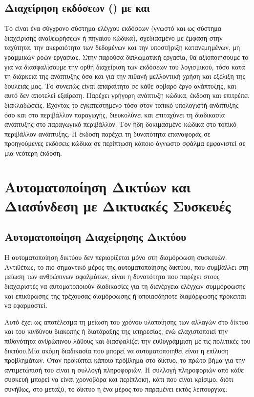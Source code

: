 \subsection{Διαχείρηση εκδόσεων () με  και  }

Το  είναι ένα σύγχρονο σύστημα ελέγχου εκδόσεων (γνωστό και ως σύστημα διαχείρισης αναθεωρήσεων ή πηγαίου κώδικα), 
σχεδιασμένο με έμφαση στην ταχύτητα, την ακεραιότητα των δεδομένων και την υποστήριξη κατανεμημένων, μη γραμμικών ροών εργασίας. 
Στην παρούσα διπλωματική εργασία, θα αξιοποιήσουμε το  για να διασφαλίσουμε την ορθή διαχείριση των εκδόσεων του λογισμικού, 
τόσο κατά τη διάρκεια της ανάπτυξης όσο και για την πιθανή μελλοντική χρήση και εξέλιξη της δουλειάς μας. Το  συνεπώς είναι απαραίτητο σε κάθε σοβαρό 
έργο ανάπτυξης, και αυτό δεν αποτελεί εξαίρεση. Παρέχει γρήγορη ανάπτυξη κώδικα, έκδοση και επιτρέπει διακλαδώσεις. Έχοντας το εγκατεστημένο τόσο στον τοπικό υπολογιστή ανάπτυξης όσο και στο περιβάλλον παραγωγής, διευκολύνει και επιταχύνει τη διαδικασία ανάπτυξης στο παραγωγικό περιβάλλον.
Τον ήδη δοκιμασμένο κώδικα στο τοπικό περιβάλλον ανάπτυξης. Η έκδοση παρέχει τη δυνατότητα επαναφοράς σε προηγούμενες εκδόσεις κώδικα σε
περίπτωση  κάποιο άγνωστο σφάλμα εμφανιστεί σε μια νεότερη έκδοση. 

\section{Αυτοματοποίηση Δικτύων και Διασύνδεση με Δικτυακές Συσκευές}

\subsection{Αυτοματοποίηση Διαχείρησης Δικτύου}

Η αυτοματοποίηση δικτύου δεν περιορίζεται μόνο στη διαμόρφωση συσκευών. 
Αντιθέτως, το πιο σημαντικό μέρος της αυτοματοποίησης δικτύου, που συμβάλλει στη μείωση των ανθρώπινων σφαλμάτων, 
είναι η δυνατότητα που παρέχει στους διαχειριστές να αυτοματοποιούν διαδικασίες για τη διενέργεια ελέγχων συμμόρφωσης και 
επικύρωσης της τρέχουσας διαμόρφωσης ή οποιασδήποτε διαμόρφωσης πρόκειται να εφαρμοστεί.

Αυτό έχει ως αποτέλεσμα τη μείωση του χρόνου υλοποίησης των αλλαγών στο δίκτυο και του κινδύνου διακοπής ή διατάραξης της υπηρεσίας, 
ενώ ελαχιστοποιεί την πιθανότητα ανθρώπινου λάθους και διασφαλίζει την ευθυγράμμιση με τις πολιτικές του δικτύου.Μία ακόμη διαδικασία που μπορεί να 
αυτοματοποιηθεί είναι η επίλυση προβλημάτων. Όταν προκύπτει κάποιο πρόβλημα στο δίκτυο, το πρώτο βήμα για την αντιμετώπισή του είναι η συλλογή πληροφοριών. 
Η συλλογή πληροφοριών από κάθε συσκευή μπορεί να είναι χρονοβόρα και περίπλοκη, κάτι που είναι κρίσιμο, διότι συνήθως, στο μεταξύ, το δίκτυο ή ένα μέρος του παραμένει 
εκτός λειτουργίας.

